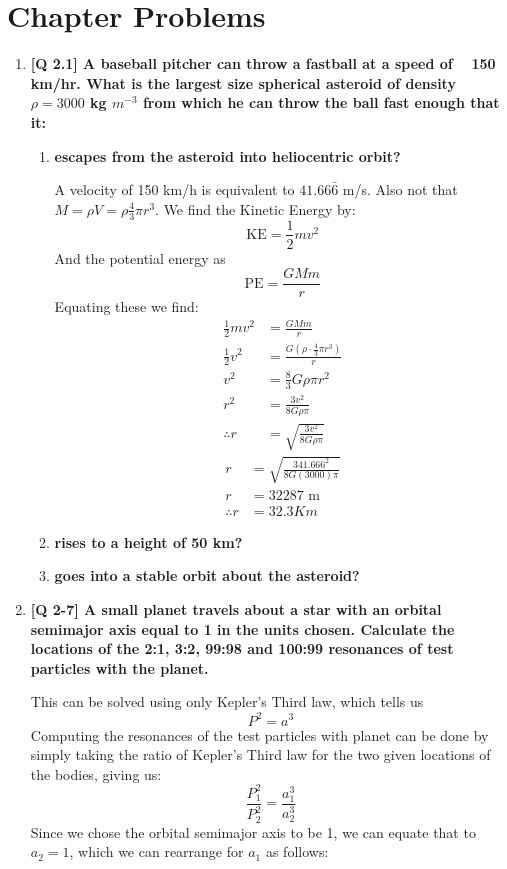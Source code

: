 \documentclass[10pt]{article}
\begin{document}
	\section{Chapter Problems}
	\begin{enumerate}
		\item  \textbf{[Q 2.1] A baseball pitcher can throw a fastball at a speed of ~ 150 km/hr. What is the largest size spherical asteroid of density $\rho = 3000$ kg $m^{-3}$ from which he can throw the ball fast enough that it:} 
		\begin{enumerate}
			\item  \textbf{escapes from the asteroid into heliocentric orbit?}
			
			A velocity of 150 km/h is equivalent to $41.66\bar{6}$ m/s. Also not that $M = \rho V = \rho \frac{4}{3} \pi r^3$. We find the Kinetic Energy by:
			\[ \text{KE} = \frac{1}{2} mv^2 \]
			And the potential energy as 
			\[ \text{PE} = \frac{GMm}{r} \]
			Equating these we find:
			\begin{align*}
				\frac{1}{2} mv^2 &= \frac{GMm}{r} \\
				\frac{1}{2} v^2 &= \frac{G \left( \rho \cdot \frac{4}{3} \pi r^3 \right)}{r} \\
				v^2 &=  \frac{8}{3} G \rho \pi r^2 \\
				r^2 &= \frac{3 v^2}{8 G \rho \pi} \\
				\therefore r &= \sqrt{\frac{3 v^2}{8 G \rho \pi}} 
			\end{align*}
			\begin{align*}
				r &= \sqrt{\frac{3 41.666^2}{8 G (3000) \pi}} \\
				r &= 32 287 \text{ m} \\
				\therefore r &= 32.3 Km
			\end{align*}
			\item  \textbf{rises to a height of 50 km?}
			\item  \textbf{goes into a stable orbit about the asteroid?}
		\end{enumerate}
		
		
		
		
		\newpage 
		\item  \textbf{ [Q 2-7] A small planet travels about a star with an orbital semimajor axis equal to 1 in the units chosen. Calculate the locations of the 2:1, 3:2, 99:98 and 100:99 resonances of test particles with the planet.}
		
		This can be solved using only Kepler's Third law, which tells us 
		\[P^2 = a^3 \]
		Computing the resonances of the test particles with planet can be done by simply taking the ratio of Kepler's Third law for the two given locations of the bodies, giving us:
		\[ \frac{P_1^2}{P_2^2} = \frac{a_1^3}{a_2^3} \]
		Since we chose the orbital semimajor axis to be 1, we can equate that to $a_2 = 1$, which we can rearrange for $a_1$ as follows:
		

\end{enumerate}
\end{document}
